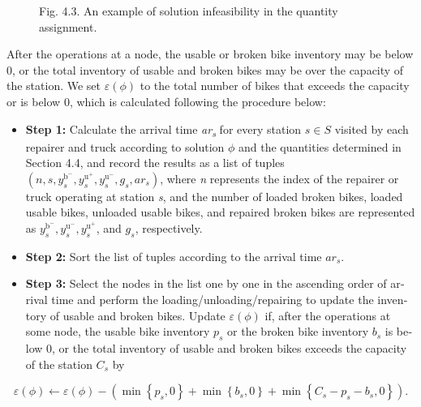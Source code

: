 \documentclass[
  english,
]{article}
\begin{document}
\begin{otherlanguage}{english}
\begin{figure}
\centering
Fig. 4.3. An example of solution infeasibility in the quantity assignment.
\caption{}\label{f0030}
\end{figure}

\protect{}\label{p0550}
After the operations at a node, the usable or broken bike inventory may be below 0, or the total
inventory of usable and broken bikes may be over the capacity of the station. We set
\(\varepsilon(\phi)\) to the total number of bikes that exceeds the capacity or is below 0, which is
calculated following the procedure below:

\begin{itemize}
\item
  \protect{}\label{p0555}
  \textbf{Step 1:} Calculate the arrival time \emph{ar\textsubscript{s}} for every station
  \(s \in S\) visited by each repairer and truck according to solution \(\phi\) and the quantities
  determined in Section 4.4, and record the results as a list of tuples
  \(\left( {n,s,y_{s}^{\text{b}^{-}},y_{s}^{\text{u}^{+}},y_{s}^{\text{u}^{-}},g_{s},ar_{s}} \right)\),
  where \emph{n} represents the index of the repairer or truck operating at station \emph{s}, and
  the number of loaded broken bikes, loaded usable bikes, unloaded usable bikes, and repaired broken
  bikes are represented as \(y_{s}^{\text{b}^{-}},y_{s}^{\text{u}^{-}},y_{s}^{\text{u}^{+}}\), and
  \(g_{s}\), respectively.
\item
  \protect{}\label{p0560}
  \textbf{Step 2:} Sort the list of tuples according to the arrival time \(ar_{s}\).
\item
  \protect{}\label{p0565}
  \textbf{Step 3:} Select the nodes in the list one by one in the ascending order of arrival time
  and perform the loading/unloading/repairing to update the inventory of usable and broken bikes.
  Update \(\varepsilon(\phi)\) if, after the operations at some node, the usable bike inventory
  \(p_{s}\) or the broken bike inventory \(b_{s}\) is below 0, or the total inventory of usable and
  broken bikes exceeds the capacity of the station \(C_{s}\) by
\end{itemize}

\[\left. \varepsilon(\phi)\leftarrow\varepsilon(\phi) - \left( {\min\left\{ {p_{s},0} \right\} + \min\left\{ {b_{s},0} \right\} + \min\left\{ {C_{s} - p_{s} - b_{s},0} \right\}} \right). \right.\]


\end{otherlanguage}
\end{document}
